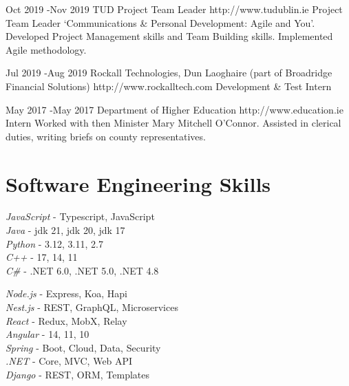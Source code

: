 \documentclass[10pt]{article} %
\begin{document}

\job
{Oct 2019 -}{Nov 2019}
{TUD Project Team Leader}
{http://www.tudublin.ie}
{Project Team Leader}
{‘Communications \& Personal Development: Agile and You’. Developed Project Management skills and Team Building skills. Implemented Agile methodology.}


\job
{Jul 2019 -}{Aug 2019}
{Rockall Technologies, Dun Laoghaire (part of Broadridge Financial Solutions)}
{http://www.rockalltech.com}
{Development \& Test Intern}
{}


\job
{May 2017 -}{May 2017}
{Department of Higher Education}
{http://www.education.ie}
{Intern}
{Worked with then Minister Mary Mitchell O’Connor. Assisted in clerical duties, writing briefs on county representatives.}


\section{Software Engineering Skills}

{
    \textit{JavaScript} - Typescript, JavaScript\\
    \textit{Java} - jdk 21, jdk 20, jdk 17\\
    \textit{Python} - 3.12, 3.11, 2.7\\
    \textit{C++} - 17, 14, 11\\
    \textit{C\#} - .NET 6.0, .NET 5.0, .NET 4.8\\
}


{
    \textit{Node.js} - Express, Koa, Hapi\\
    \textit{Nest.js} - REST, GraphQL, Microservices\\
    \textit{React} - Redux, MobX, Relay\\
    \textit{Angular} - 14, 11, 10\\
    \textit{Spring} - Boot, Cloud, Data, Security\\
    \textit{.NET} - Core, MVC, Web API\\
    \textit{Django} - REST, ORM, Templates\\
}
\end{document}
